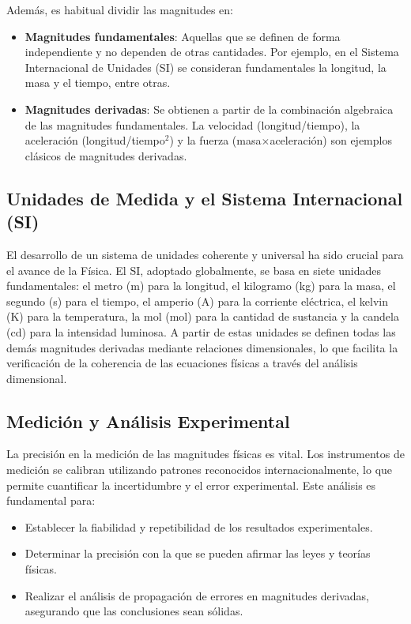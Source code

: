 Además, es habitual dividir las magnitudes en:

\begin{itemize}
    \item \textbf{Magnitudes fundamentales}: Aquellas que se definen de forma independiente y no dependen de otras cantidades. Por ejemplo, en el Sistema Internacional de Unidades (SI) se consideran fundamentales la longitud, la masa y el tiempo, entre otras.
    \item \textbf{Magnitudes derivadas}: Se obtienen a partir de la combinación algebraica de las magnitudes fundamentales. La velocidad (longitud/tiempo), la aceleración (longitud/tiempo$^2$) y la fuerza (masa$\times$aceleración) son ejemplos clásicos de magnitudes derivadas.
\end{itemize}

\subsection{Unidades de Medida y el Sistema Internacional (SI)}

El desarrollo de un sistema de unidades coherente y universal ha sido crucial para el avance de la Física. El SI, adoptado globalmente, se basa en siete unidades fundamentales: el metro (m) para la longitud, el kilogramo (kg) para la masa, el segundo (s) para el tiempo, el amperio (A) para la corriente eléctrica, el kelvin (K) para la temperatura, la mol (mol) para la cantidad de sustancia y la candela (cd) para la intensidad luminosa. A partir de estas unidades se definen todas las demás magnitudes derivadas mediante relaciones dimensionales, lo que facilita la verificación de la coherencia de las ecuaciones físicas a través del análisis dimensional.

\subsection{Medición y Análisis Experimental}

La precisión en la medición de las magnitudes físicas es vital. Los instrumentos de medición se calibran utilizando patrones reconocidos internacionalmente, lo que permite cuantificar la incertidumbre y el error experimental. Este análisis es fundamental para:
\begin{itemize}
    \item Establecer la fiabilidad y repetibilidad de los resultados experimentales.
    \item Determinar la precisión con la que se pueden afirmar las leyes y teorías físicas.
    \item Realizar el análisis de propagación de errores en magnitudes derivadas, asegurando que las conclusiones sean sólidas.
\end{itemize}

